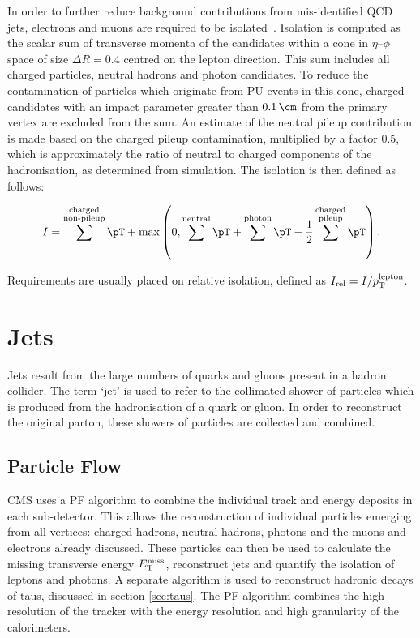 In order to further reduce background contributions from mis-identified QCD jets,
electrons and muons are required to be isolated~\cite{CMS:2013hoa,MuonReco}. 
Isolation is computed as the scalar sum of transverse momenta of the candidates within a cone in
$\eta$--$\phi$ space of size $\Delta R = 0.4$ centred on the lepton direction. 
This sum includes all charged particles, neutral hadrons and photon candidates. 
To reduce the contamination of particles which originate from \ac{PU} events 
in this cone, charged  candidates with an impact parameter greater than 
$0.1\,\cm$ from the primary vertex are excluded from the sum. An estimate of the 
neutral pileup contribution is made based on the charged pileup contamination,
multiplied by a factor 0.5, which is approximately the ratio of neutral to
charged components of the hadronisation, as determined from simulation.   
The isolation is then defined as follows:

\begin{equation}
I = \sum^{\substack{\text{charged} \\ \text{non-pileup}}}\pT +
\text{max}\left(0,\sum^{\text{neutral}}\pT+\sum^{\text{photon}}\pT-\frac{1}{2}\sum^{\substack{\text{charged}
\\ \text{pileup}}}\pT\right).
\end{equation}

Requirements are usually placed on relative isolation, defined as
$I_{\text{rel}} = I / p_{\mathrm{T}}^{\text{lepton}}$. 

\section{Jets}
\label{sec:jets}

Jets result from the large numbers of quarks and gluons present in a hadron
collider. The term `jet' is used to refer to the collimated shower of particles
which is produced from the hadronisation of a quark or gluon. In order to
reconstruct the original parton, these showers of particles are collected
and combined. 

\subsection{Particle Flow}
\label{sec:particleflow}

CMS uses a \ac{PF} \cite{CMS-PAS-PFT-09-001,CMS-PAS-PFT-10-001,CMS-PAS-PFT-10-002} 
algorithm to combine the individual track and energy deposits in each sub-detector. 
This allows the reconstruction of individual particles emerging from all vertices: charged
hadrons, neutral hadrons, photons and the muons and electrons already discussed.
These particles can then be 
used to calculate the missing transverse energy $E_{\mathrm{T}}^{\text{miss}}$,
reconstruct jets and quantify the isolation of leptons and photons. A separate
algorithm is used to reconstruct hadronic decays of taus, discussed in section
\ref{sec:taus}. The \ac{PF} algorithm combines the high resolution of
the tracker with the energy resolution and high granularity of the calorimeters.

